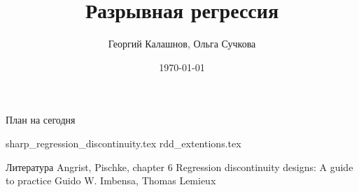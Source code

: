 \documentclass[12pt]{beamer}
\title{Разрывная регрессия}
\author[Георгий Калашнов, Ольга Сучкова]{Георгий Калашнов, Ольга Сучкова}
\date{\today}
\begin{document}
\begin{frame}
  \titlepage
  
\end{frame}



\begin{frame}{План на сегодня} 
\tableofcontents
\end{frame}

{sharp_regression_discontinuity.tex}
{rdd_extentions.tex}


\begin{frame}{Литература}
    Angrist, Pischke, chapter 6
    Regression discontinuity designs: A guide to practice Guido W. Imbensa, Thomas Lemieux
\end{frame}
\end{document}
